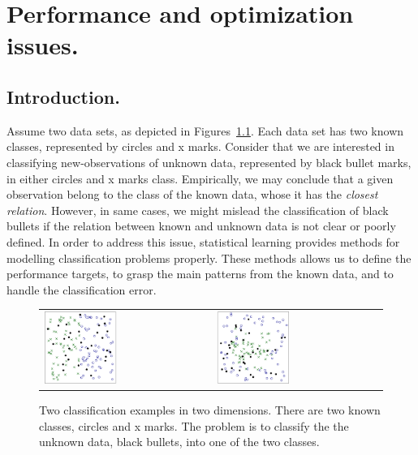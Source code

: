 \chapter{Performance and optimization issues.}

	\section{Introduction.}

		Assume two data sets, as depicted in 
		Figures~\ref{fig:chap1_scatters}. Each data set has two known classes, 
		represented by circles and x marks. Consider that we are interested in 
		classifying new-observations of unknown data, represented by black bullet 
		marks, in either circles and x marks class. 
      Empirically, we may conclude that a given observation belong to the class 
		of the known  data, whose it has the \emph{closest relation}. However, 
      in same cases,  we might mislead the  classification of black bullets if the 
		relation between known and unknown data is not clear or poorly defined. 
      In order to address this issue, statistical learning provides methods 
		for modelling classification problems properly. These methods allows us to 
		define the performance targets, to grasp the main patterns from the known data, 
		and to handle the classification error.

		\begin{figure}
			\centering
			\begin{tabular}{l@{}l@{}}
		 		\includegraphics[width=0.45\textwidth]{inputs/img/chap1_scatter_intro_ds1} &
				\includegraphics[width=0.45\textwidth]{inputs/img/chap1_scatter_intro_ds2} \\
			\end{tabular}
			\caption{Two classification examples in two dimensions. There are two known classes, circles and x marks. The problem is to classify the the unknown data, black bullets, into one of the two classes.}
		  	\label{fig:chap1_scatters}
		\end{figure}


